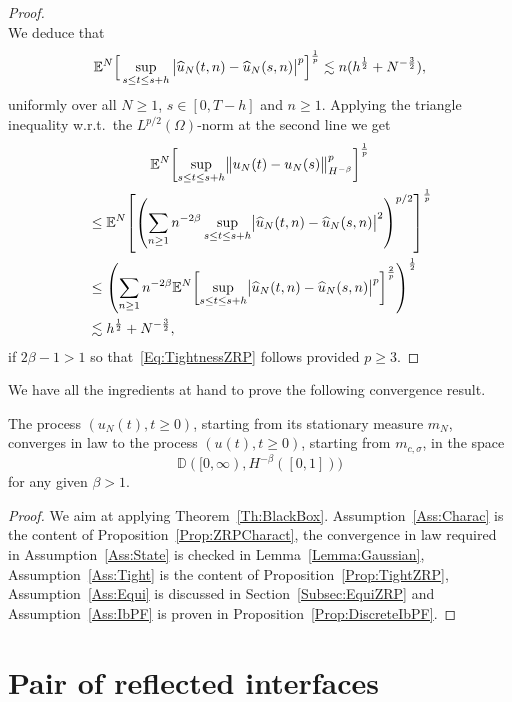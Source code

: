 \documentclass[AHL,Unicode,longabstracts]{cedram}
\theoremstyle{plain}
\newcommand{\bbD}{\mathbb{D}}
\newcommand{\bbE}{\mathbb{E}}
\let\oldhat\hat
\renewcommand*{\hat}[1]{\mathchoice{\widehat{#1}}{\widehat{#1}}{\oldhat{#1}}{\oldhat{#1}}}
\let\originalleft\left
\let\originalright\right
\renewcommand{\left}{\mathopen{}\mathclose\bgroup\originalleft}
\renewcommand{\right}{\aftergroup\egroup\originalright}
\begin{document}
\begin{proof}
\[\]
We deduce that
\begin{equation*}
\bbE^N \Big[\sup_{s\leq t \leq s+h} \big|\hat{u}_N(t,n)-\hat{u}_N(s,n)\big|^p\Big]^{\frac{1}{p}} \lesssim n(h^{\frac{1}{2}} + N^{-\frac{3}{2}}),
\end{equation*}
uniformly over all $N\geq 1$, $s\in [0,T-h]$ and $n\geq 1$. Applying the triangle inequality w.r.t.~the $L^{p/2}(\Omega)$-norm at the second line we get
\begin{multline*}
\bbE^N \left[\sup_{s\leq t \leq s+h} \bigl\|u_N(t)-u_N(s)\bigr\|^p_{H^{-\beta}}\right]^{\frac{1}{p}}\\
\begin{aligned} 
&\leq \bbE^N \left[\left(\sum_{n\geq 1} n^{-2\beta}\sup_{s\leq t \leq s+h} \bigl|\hat{u}_N(t,n)-\hat{u}_N(s,n)\bigr|^{2}\right)^{p/2}\right]^{\frac{1}{p}}\\
&\leq \left(\sum_{n\geq 1} n^{-2\beta} \bbE^N \left[\sup_{s\leq t \leq s+h} \bigl|\hat{u}_N(t,n)-\hat{u}_N(s,n)\bigr|^{p}\right]^{\frac{2}{p}}\right)^{\frac{1}{2}}\\
&\lesssim h^{\frac{1}{2}} + N^{-\frac{3}{2}},
\end{aligned}
\end{multline*}
if $2\beta-1>1$ so that~\eqref{Eq:TightnessZRP} follows provided $p\ge 3$.
\end{proof}

We have all the ingredients at hand to prove the following convergence result.

\begin{theo}\label{Th:ZRP}
The process $(u_N(t), t\ge 0)$, starting from its stationary measure $m_N$, converges in law to the process $(u(t),t\ge 0)$, starting from $m_{c,\sigma}$, in the space
\[
\bbD([0,\infty),H^{-\beta}([0,1]))
\]
for any given $\beta > 1$.
\end{theo}
\begin{proof}
We aim at applying Theorem~\ref{Th:BlackBox}. Assumption~\ref{Ass:Charac} is the content of Proposition~\ref{Prop:ZRPCharact}, the convergence in law required in Assumption~\ref{Ass:State} is checked in Lemma~\ref{Lemma:Gaussian}, Assumption~\ref{Ass:Tight} is the content of Proposition~\ref{Prop:TightZRP}, Assumption~\ref{Ass:Equi} is discussed in Section~\ref{Subsec:EquiZRP} and Assumption~\ref{Ass:IbPF} is proven in Proposition~\ref{Prop:DiscreteIbPF}.
\end{proof}


\section{Pair of reflected interfaces}\label{Sec:Reflected}
\end{document}
